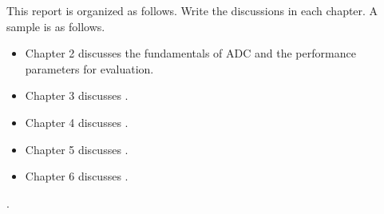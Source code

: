 This report is organized as follows. Write the discussions in each chapter. A sample is as follows.
\begin{itemize}
\item Chapter 2 discusses the fundamentals of ADC and the performance parameters for evaluation.
\item Chapter 3 discusses .
\item Chapter 4 discusses .
\item Chapter 5 discusses .
\item Chapter 6 discusses .
\end{itemize}

.